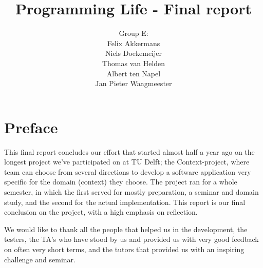 \documentclass[a4paper]{article}
\title{Programming Life - Final report}
\author{Group E:\\
Felix Akkermans \\
Niels Doekemeijer \\
Thomas van Helden \\
Albert ten Napel \\
Jan Pieter Waagmeester}
\begin{document}
\maketitle
\thispagestyle{empty}
\vfill

\small{\tableofcontents}
\pagebreak

\section*{Preface}
This final report concludes our effort that started almost half a year ago on the longest project we've participated on at TU Delft; the Context-project, where team can choose from several directions to develop a software application very specific for the domain (context) they choose. The project ran for a whole semester, in which the first served for mostly preparation, a seminar and domain study, and the second for the actual
 implementation. This report is our final conclusion on the project, with a high emphasis on reflection.

We would like to thank all the people that helped us in the development, the testers, the TA's who have stood by us and provided us with very good feedback on often very short terms, and the tutors that provided us with an inspiring challenge and seminar.\\
\end{document}
